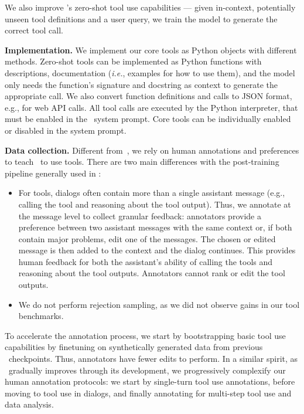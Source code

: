 \documentclass[dvipsnames]{fairmeta}
\begin{document}
We also improve \llamathree's zero-shot tool use capabilities --- given in-context, potentially unseen tool definitions and a user query, we train the model to generate the correct tool call. 

\textbf{Implementation.}
We implement our core tools as Python objects with different methods. Zero-shot tools can be implemented as Python functions with descriptions, documentation (\emph{i.e.}, examples for how to use them), and the model only needs the function's signature and docstring as context to generate the appropriate call. We also convert function definitions and calls to JSON format, e.g., for web API calls. All tool calls are executed by the Python interpreter, that must be enabled in the \llamathree~system prompt. Core tools can be individually enabled or disabled in the system prompt. 

\textbf{Data collection.}
Different from~\citet{schick2024toolformer}, we rely on human annotations and preferences to teach \llamathree~to use tools. There are two main differences with the post-training pipeline generally used in \llamathree:
\begin{itemize}
    \item For tools, dialogs often contain more than a single assistant message (e.g., calling the tool and reasoning about the tool output). Thus, we annotate at the message level to collect granular feedback: annotators provide a preference between two assistant messages with the same context or, if both contain major problems, edit one of the messages. The chosen or edited message is then added to the context and the dialog continues. This provides human feedback for both the assistant's ability of calling the tools and reasoning about the tool outputs. Annotators cannot rank or edit the tool outputs. 
    \item We do not perform rejection sampling, as we did not observe gains in our tool benchmarks.
\end{itemize}

To accelerate the annotation process, we start by bootstrapping basic tool use capabilities by finetuning on synthetically generated data from previous \llamathree~checkpoints. Thus, annotators have fewer edits to perform. In a similar spirit, as \llamathree~gradually improves through its development, we progressively complexify our human annotation protocols: we start by single-turn tool use annotations, before moving to tool use in dialogs, and finally annotating for multi-step tool use and data analysis.
\end{document}
